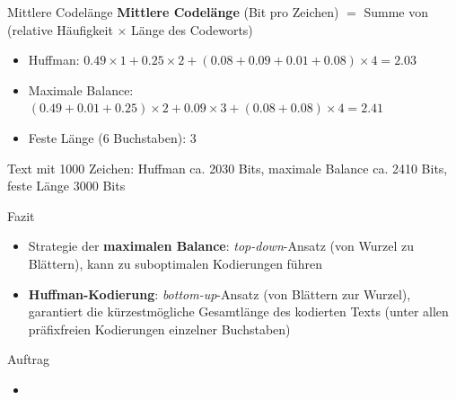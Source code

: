 \begin{frame}{Mittlere Codelänge}
	\textbf{Mittlere Codelänge} (Bit pro Zeichen) $=$ Summe von (relative Häufigkeit $\times$ Länge des Codeworts)
	\begin{itemize}
		\item Huffman: $0.49\times1 + 0.25\times2 + (0.08+0.09+0.01+0.08)\times4 = 2.03$
		\item Maximale Balance: $(0.49+0.01+0.25)\times2 + 0.09\times3 + (0.08+0.08)\times4 = 2.41$
		\item Feste Länge (6 Buchstaben): 3
	\end{itemize}
	Text mit 1000 Zeichen: Huffman ca. 2030 Bits, maximale Balance ca. 2410 Bits, feste Länge 3000 Bits
\end{frame}

\begin{frame}{Fazit}
	\begin{itemize}
		\item Strategie der \textbf{maximalen Balance}: \textit{top-down}-Ansatz (von Wurzel zu Blättern), kann zu suboptimalen Kodierungen führen
		\item \textbf{Huffman-Kodierung}: \textit{bottom-up}-Ansatz (von Blättern zur Wurzel), garantiert die kürzestmögliche Gesamtlänge des kodierten Texts (unter allen präfixfreien Kodierungen einzelner Buchstaben)
	\end{itemize}
\end{frame}

\begin{frame}[label=auftrag]{Auftrag}
	\begin{itemize}
		\item {}
	\end{itemize}
\end{frame}

